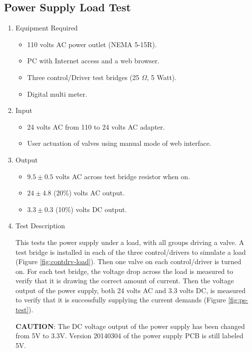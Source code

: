 \documentclass{article}
\begin{document}
\clearpage
\subsection{Power Supply Load Test}

\begin{enumerate}
\item Equipment Required
	\begin{itemize}
	\item 110 volts AC power outlet (NEMA 5-15R).
	\item PC with Internet access and a web browser.
	\item Three control/Driver test bridges (25 $\Omega$, 5 Watt).
	\item Digital multi meter.
	\end{itemize}
\item Input
	\begin{itemize}
	\item 24 volts AC from 110 to 24 volts AC adapter.
	\item User actuation of valves using manual mode of web interface.
	\end{itemize}
\item Output
	\begin{itemize}
	\item $9.5\pm0.5$ volts AC across test bridge resistor when on.
	\item $24\pm4.8$ (20\%) volts AC output.
	\item $3.3\pm0.3$ (10\%) volts DC output.
	\end{itemize}
\item Test Description \\
\vspace{0.5em}

This tests the power supply under a load, with all groups driving a valve.
A test bridge is installed in each of the three control/drivers
to simulate a load (Figure \ref{fig:contdrv-load}).
Then one valve on each control/driver is turned on.
For each test bridge, the voltage drop across the load is measured
to verify that it is drawing the correct amount of current.
Then the voltage output of the power supply, both 24 volts AC and
3.3 volts DC, is measured to verify that it is successfully
supplying the current demands (Figure \ref{fig:ps-test}).

\begin{framed}
\textbf{CAUTION}: The DC voltage output of the power supply has
been changed from 5V to 3.3V.
Version 20140304 of the power supply PCB is still labeled 5V.
\end{framed}


\end{enumerate}
\end{document}
